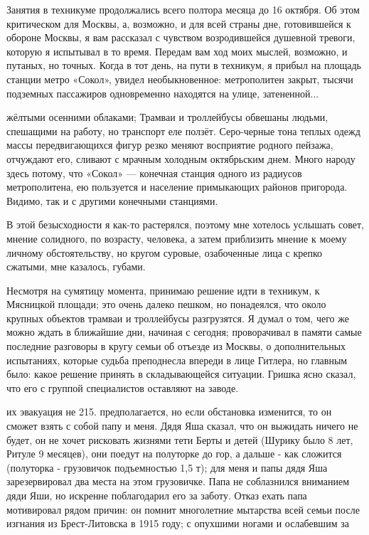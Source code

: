 \label{211-1}
Занятия в техникуме продолжались всего полтора месяца до 16 октября. Об этом критическом для Москвы, а, возможно, и для всей страны дне, готовившейся к обороне Москвы, я вам рассказал с чувством возродившейся душевной тревоги, которую я испытывал в то время. Передам вам ход моих мыслей, возможно, и путаных, но точных. Когда в тот день, на пути в техникум, я прибыл на площадь станции метро «Сокол», увидел необыкновенное: метрополитен закрыт, тысячи подземных пассажиров одновременно находятся на улице, затененной...

\label{212-1}
жёлтыми осенними облаками; Трамваи и троллейбусы обвешаны людьми, спешащими на работу, но транспорт еле ползёт. Серо-черные тона теплых одежд массы передвигающихся фигур резко меняют восприятие родного пейзажа, отчуждают его, сливают с мрачным холодным октябрьским днем. Много народу здесь потому, что «Сокол» — конечная станция одного из радиусов метрополитена, ею пользуется и население примыкающих районов пригорода. Видимо, так и с другими конечными станциями.

\label{213-1}
В этой безысходности я как-то растерялся, поэтому мне хотелось услышать совет, мнение солидного, по возрасту, человека, а затем приблизить мнение к моему личному обстоятельству, но кругом суровые, озабоченные лица с крепко сжатыми, мне казалось, губами.

\label{214-1}
Несмотря на сумятицу момента, принимаю решение идти в техникум, к Мясницкой площади; это очень далеко пешком, но понадеялся, что около крупных объектов трамваи и троллейбусы разгрузятся. Я думал о том, чего же можно ждать в ближайшие дни, начиная с сегодня; проворачивал в памяти самые последние разговоры в кругу семьи об отъезде из Москвы, о дополнительных испытаниях, которые судьба преподнесла впереди в лице Гитлера, но главным было: какое решение принять в складывающейся ситуации. Гришка ясно сказал, что его с группой специалистов оставляют на заводе.

\label{215-1}
их эвакуация не 215. предполагается, но если обстановка изменится, то он сможет взять с собой папу и меня. Дядя Яша сказал, что он выжидать ничего не будет, он не хочет рисковать жизнями тети Берты и детей (Шурику было 8 лет, Ритуле 9 месяцев), они поедут на полуторке до гор, а дальше - как сложится (полуторка - грузовичок подъемностью 1,5 т); для меня и папы дядя Яша зарезервировал два места на этом грузовичке. Папа не соблазнился вниманием дяди Яши, но искренне поблагодарил его за заботу. Отказ ехать папа мотивировал рядом причин: он помнит многолетние мытарства всей семьи после изгнания из Брест-Литовска в 1915 году; с опухшими ногами и ослабевшим за

